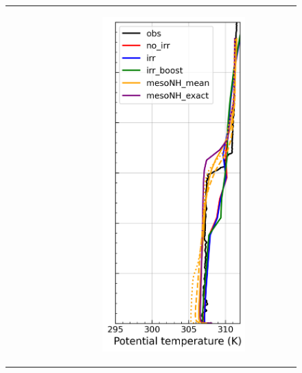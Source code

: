 \begin{figure}[hbtp]
{\begin{tabular}{@{}cccc@{}}
\begin{subfigure}[t]{0.29\textwidth}
        \end{subfigure} &
        \begin{subfigure}[t]{0.285\textwidth}
            \caption{}
            \includegraphics[width=\textwidth]{images/chap5/profiles/profile_elsplans_theta_2007_sensbins.png}

\end{subfigure}
\end{tabular}}
\end{figure}
